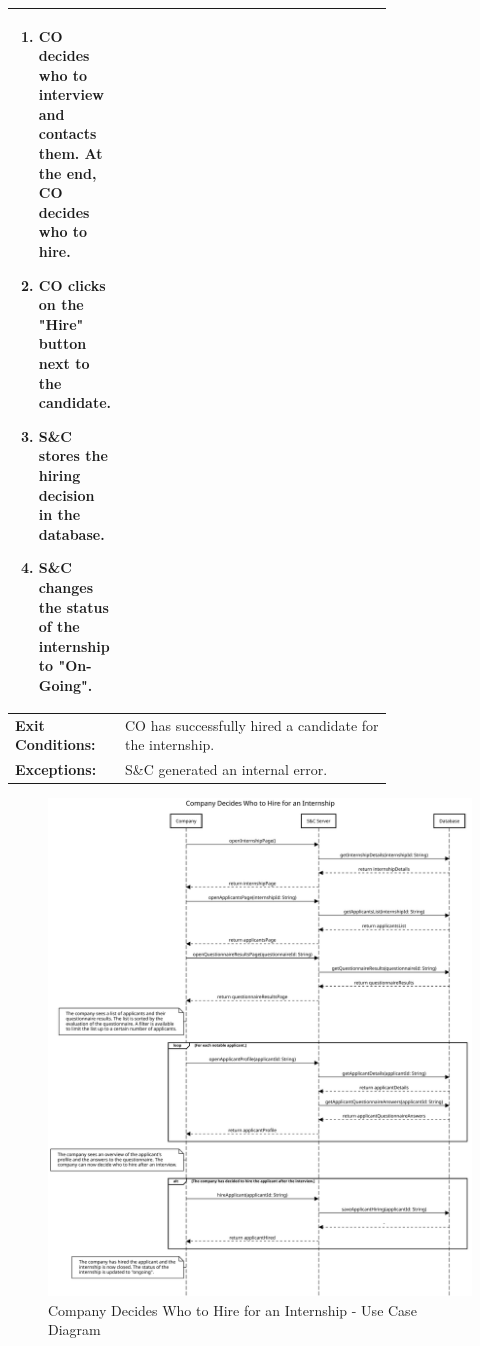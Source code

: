 \begin{center}
\begin{longtable}{|l|p{0.75\linewidth}|}
\begin{enumerate}
                                         \item CO decides who to interview and contacts them. At the end, CO decides who to hire.
                                         \item CO clicks on the "Hire" button next to the candidate.
                                         \item S\&C stores the hiring decision in the database.
                                         \item S\&C changes the status of the internship to "On-Going".
                                     \end{enumerate} \\
        \hline
        \textbf{Exit Conditions:}  & CO has successfully hired a candidate for the internship.                               \\
        \hline
        \textbf{Exceptions:}       & S\&C generated an internal error.                                                       \\
        \hline
    \end{longtable}
\end{center}

\begin{figure}[H]
    \centering
    \includegraphics[width=1.0\textwidth]{Images/UC_14A.pdf}
    \caption{Company Decides Who to Hire for an Internship - Use Case Diagram}
    \label{fig:use-case-diagram-15}
\end{figure}

